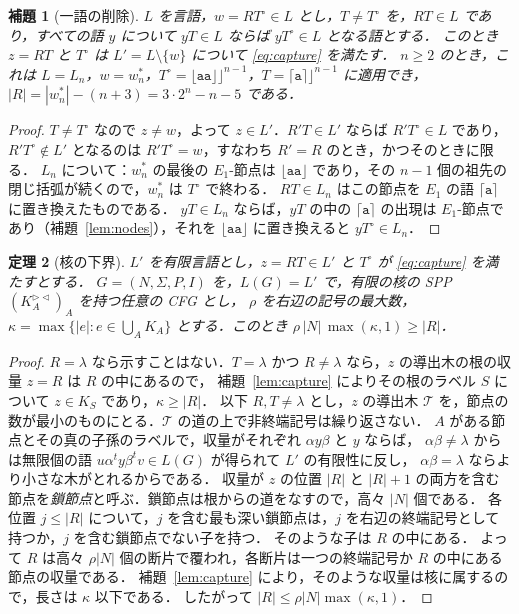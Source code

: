 \documentclass[11pt,a4paper]{ltjsarticle}
\numberwithin{equation}{section}
\theoremstyle{plain}
\newtheorem{theorem}{定理}[section]
\newtheorem{lemma}[theorem]{補題}
\theoremstyle{definition}
\theoremstyle{remark}
\theoremstyle{plain}
\newcommand{\eps}{\lambda}
\newcommand{\RL}{^{\rhd\lhd}}
\newcommand{\Lfl}{\lfloor}
\newcommand{\Rfl}{\rfloor}
\newcommand{\Lce}{\lceil}
\newcommand{\Rce}{\rceil}
\newcommand{\ta}{\mathtt a}
\begin{document}
\begin{lemma}[一語の削除]\label{lem:one-word}
$L$ を言語，$w=RT^\circ\in L$ とし，$T\ne T^\circ$ を，$RT\in L$ であり，すべての語 $y$ について $yT\in L$ ならば $yT^\circ\in L$ となる語とする．
このとき $z=RT$ と $T^\circ$ は $L'=L\setminus\{w\}$ について \eqref{eq:capture} を満たす．
$n\ge2$ のとき，これは $L=L_n$，$w=w^*_n$，$T^\circ=\Lfl\ta\ta\Rfl\Rfl^{n-1}$，$T=\Lce\ta\Rce\Rfl^{n-1}$ に適用でき，
$|R|=|w^*_n|-(n+3)=3\cdot2^n-n-5$ である．
\end{lemma}
\begin{proof}
$T\ne T^\circ$ なので $z\ne w$，よって $z\in L'$．$R'T\in L'$ ならば $R'T^\circ\in L$ であり，
$R'T^\circ\notin L'$ となるのは $R'T^\circ=w$，すなわち $R'=R$ のとき，かつそのときに限る．
$L_n$ について：$w^*_n$ の最後の $E_1$-節点は $\Lfl\ta\ta\Rfl$ であり，その $n-1$ 個の祖先の閉じ括弧が続くので，$w^*_n$ は $T^\circ$ で終わる．
$RT\in L_n$ はこの節点を $E_1$ の語 $\Lce\ta\Rce$ に置き換えたものである．
$yT\in L_n$ ならば，$yT$ の中の $\Lce\ta\Rce$ の出現は $E_1$-節点であり（補題~\ref{lem:nodes}），それを $\Lfl\ta\ta\Rfl$ に置き換えると $yT^\circ\in L_n$．
\end{proof}

\begin{theorem}[核の下界]\label{thm:general-lower}
$L'$ を有限言語とし，$z=RT\in L'$ と $T^\circ$ が \eqref{eq:capture} を満たすとする．
$G=(N,\Sigma,P,I)$ を，$L(G)=L'$ で，有限の核の SPP $(K_A\RL)_A$ を持つ任意の CFG とし，
$\rho$ を右辺の記号の最大数，$\kappa=\max\{|e|:e\in\bigcup_AK_A\}$ とする．このとき $\rho\,|N|\,\max(\kappa,1)\ge|R|$．
\end{theorem}
\begin{proof}
$R=\eps$ なら示すことはない．$T=\eps$ かつ $R\ne\eps$ なら，$z$ の導出木の根の収量 $z=R$ は $R$ の中にあるので，
補題~\ref{lem:capture} によりその根のラベル $S$ について $z\in K_S$ であり，$\kappa\ge|R|$．
以下 $R,T\ne\eps$ とし，$z$ の導出木 $\mathcal T$ を，節点の数が最小のものにとる．$\mathcal T$ の道の上で非終端記号は繰り返さない．
$A$ がある節点とその真の子孫のラベルで，収量がそれぞれ $\alpha y\beta$ と $y$ ならば，
$\alpha\beta\ne\eps$ からは無限個の語 $u\alpha^ty\beta^tv\in L(G)$ が得られて $L'$ の有限性に反し，
$\alpha\beta=\eps$ ならより小さな木がとれるからである．
収量が $z$ の位置 $|R|$ と $|R|+1$ の両方を含む節点を\emph{鎖節点}と呼ぶ．鎖節点は根からの道をなすので，高々 $|N|$ 個である．
各位置 $j\le|R|$ について，$j$ を含む最も深い鎖節点は，$j$ を右辺の終端記号として持つか，$j$ を含む鎖節点でない子を持つ．
そのような子は $R$ の中にある．
よって $R$ は高々 $\rho|N|$ 個の断片で覆われ，各断片は一つの終端記号か $R$ の中にある節点の収量である．
補題~\ref{lem:capture} により，そのような収量は核に属するので，長さは $\kappa$ 以下である．
したがって $|R|\le\rho|N|\max(\kappa,1)$．
\end{proof}
\end{document}
